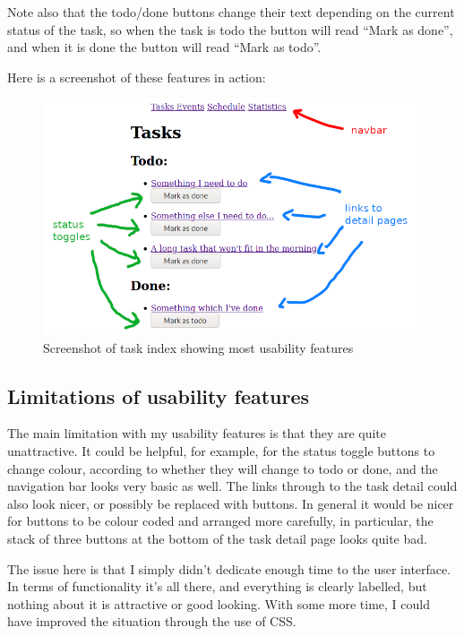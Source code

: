 \documentclass{article}
\begin{document}
Note also that the todo/done buttons change their text depending on the current status of the task,
so when the task is todo the button will read ``Mark as done'',
and when it is done the button will read ``Mark as todo''.

Here is a screenshot of these features in action:
\begin{figure}[H]
	\includegraphics[width=\linewidth]{Screenshots/task_index_usability.png}
	\caption{Screenshot of task index showing most usability features}
	\label{fig:task_index_usability}
\end{figure}

\subsection{Limitations of usability features}
The main limitation with my usability features is that they are quite unattractive.
It could be helpful, for example,
for the status toggle buttons to change colour,
according to whether they will change to todo or done,
and the navigation bar looks very basic as well.
The links through to the task detail could also look nicer,
or possibly be replaced with buttons.
In general it would be nicer for buttons to be colour coded and arranged more carefully,
in particular,
the stack of three buttons at the bottom of the task detail page looks quite bad.

The issue here is that I simply didn't dedicate enough time to the user interface.
In terms of functionality it's all there,
and everything is clearly labelled,
but nothing about it is attractive or good looking.
With some more time,
I could have improved the situation through the use of CSS.
\end{document}
